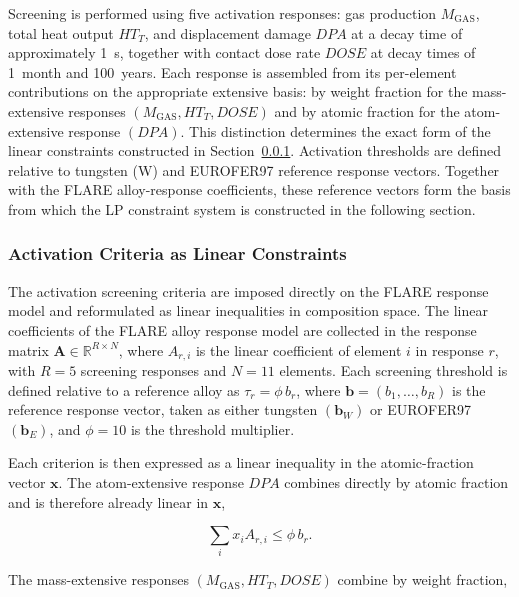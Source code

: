 Screening is performed using five activation responses: gas production
\(M_{\mathrm{GAS}}\), total heat output \(HT_T\), and displacement damage
\(DPA\) at a decay time of approximately 1~s, together with contact dose rate
\(DOSE\) at decay times of 1~month and 100~years. Each response is assembled
from its per-element contributions on the appropriate extensive basis: by
weight fraction for the mass-extensive responses
\((M_{\mathrm{GAS}}, HT_T, DOSE)\) and by atomic fraction for the atom-extensive
response \((DPA)\). This distinction determines the exact form of the linear
constraints constructed in Section~\ref{sec:activation-constraints}. Activation thresholds are defined
relative to tungsten (W) and EUROFER97 reference response vectors. Together with
the FLARE alloy-response coefficients, these reference vectors form the basis
from which the LP constraint system is constructed in the following section.


\subsubsection{Activation Criteria as Linear Constraints}
\label{sec:activation-constraints}

The activation screening criteria are imposed directly on the FLARE response
model and reformulated as linear inequalities in composition space. The linear
coefficients of the FLARE alloy response model are collected in the response
matrix \(\mathbf{A}\in\mathbb{R}^{R\times N}\), where \(A_{r,i}\) is the linear
coefficient of element \(i\) in response \(r\), with \(R=5\) screening responses
and \(N=11\) elements. Each screening threshold is defined relative to a reference
alloy as \(\tau_r = \phi\, b_r\), where
\(\mathbf{b}=(b_1,\ldots,b_R)\) is the reference response vector, taken as
either tungsten \((\mathbf{b}_W)\) or EUROFER97 \((\mathbf{b}_E)\), and
\(\phi = 10\) is the threshold multiplier.

Each criterion is then expressed as a linear inequality in the atomic-fraction
vector \(\mathbf{x}\). The atom-extensive response \(DPA\) combines directly by
atomic fraction and is therefore already linear in \(\mathbf{x}\),

\begin{equation}
\sum_i x_i A_{r,i} \le \phi\, b_r .
\label{eq:atom_constraint}
\end{equation}

The mass-extensive responses \((M_{\mathrm{GAS}}, HT_T, DOSE)\) combine by
weight fraction,

